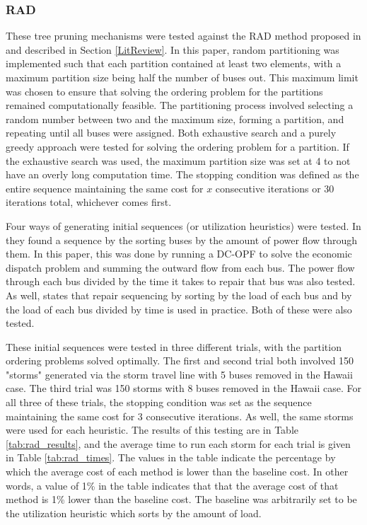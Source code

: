 \documentclass[12pt]{article}
\begin{document}
\subsubsection{RAD}
These tree pruning mechanisms were tested against the RAD method proposed in \cite{coffrin2012} and described in Section \ref{LitReview}. In this paper, random partitioning was implemented such that each partition contained at least two elements, with a maximum partition size being half  the number of buses out. This maximum limit was chosen to ensure that solving the ordering problem for the partitions remained computationally feasible. The partitioning process involved selecting a random number between two and the maximum size, forming a partition, and repeating until all buses were assigned. Both exhaustive search and a purely greedy approach were tested for solving the ordering problem for a partition. If the exhaustive search was used, the maximum partition size was set at 4 to not have an overly long computation time.  The stopping condition was defined as the entire sequence maintaining the same cost for $x$ consecutive iterations or 30 iterations total, whichever comes first. \par

Four ways of generating initial sequences (or utilization heuristics) were tested. In \cite{coffrin2012} they found a sequence by the sorting buses by the amount of power flow through them. In this paper, this was done by running a DC-OPF to solve the economic dispatch problem and summing the outward flow from each bus. The power flow through each bus divided by the time it takes to repair that bus was also tested. As well, \cite{tan} states that repair sequencing by sorting by the load of each bus and by the load of each bus divided by time is used in practice. Both of these were also tested.

These initial sequences were tested in three different trials, with the partition ordering problems solved optimally. The first and second trial both involved 150 "storms" generated via the storm travel line with 5 buses removed in the Hawaii case. The third trial was 150 storms with 8 buses removed in the Hawaii case. For all three of these trials, the stopping condition was set as the sequence maintaining the same cost for 3 consecutive iterations. As well, the same storms were used for each heuristic. The results of this testing are in Table \ref{tab:rad_results}, and the average time to run each storm  for each trial is given in Table \ref{tab:rad_times}. The values in the table indicate the percentage by which the average cost of each method is lower than the baseline cost. In other words, a value of 1\% in the table indicates that that the average cost of that method is 1\% lower than the baseline cost. The baseline  was arbitrarily set to be the utilization heuristic which sorts by the amount of load. 
\end{document}
